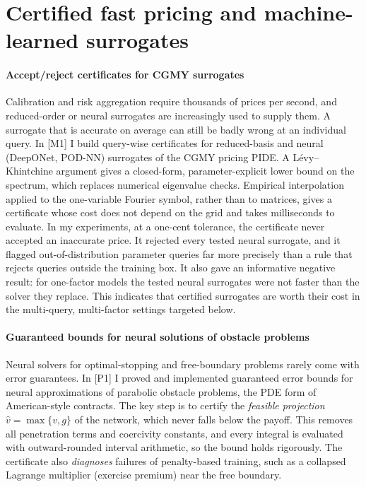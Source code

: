 \documentclass[11pt]{article}
\newcommand{\rc}[1]{\textcolor{accent}{[#1]}}
\begin{document}
\section{Certified fast pricing and machine-learned surrogates}

\paragraph{Accept/reject certificates for CGMY surrogates}
Calibration and risk aggregation require thousands of prices per second,
and reduced-order or neural surrogates are increasingly used to supply
them. A surrogate that is accurate on average can still be badly wrong at
an individual query. In \rc{M1} I build query-wise certificates for
reduced-basis and neural (DeepONet, POD-NN) surrogates of the CGMY pricing
PIDE. A L\'evy--Khintchine argument gives a closed-form,
parameter-explicit lower bound on the spectrum, which replaces numerical
eigenvalue checks. Empirical interpolation applied to the one-variable
Fourier symbol, rather than to matrices, gives a certificate whose cost
does not depend on the grid and takes milliseconds to evaluate. In my
experiments, at a one-cent tolerance, the certificate never accepted an
inaccurate price. It rejected every tested neural surrogate, and it
flagged out-of-distribution parameter queries far more precisely than a
rule that rejects queries outside the training box. %
It also gave an informative negative result: for one-factor models the
tested neural surrogates were not faster than the solver they replace.
This indicates that certified surrogates are worth their cost in the
multi-query, multi-factor settings targeted below.

\paragraph{Guaranteed bounds for neural solutions of obstacle problems}
Neural solvers for optimal-stopping and free-boundary problems rarely come
with error guarantees. In \rc{P1} I proved and implemented guaranteed error
bounds for neural approximations of parabolic obstacle problems, the PDE
form of American-style contracts. The key step is to certify the
\emph{feasible projection} $\hat v=\max\{v,g\}$ of the network, which never
falls below the payoff. This removes all penetration terms and coercivity
constants, and every integral is evaluated with outward-rounded interval
arithmetic, so the bound holds rigorously. The certificate also
\emph{diagnoses} failures of penalty-based training, such as a collapsed
Lagrange multiplier (exercise premium) near the free boundary.
\end{document}

